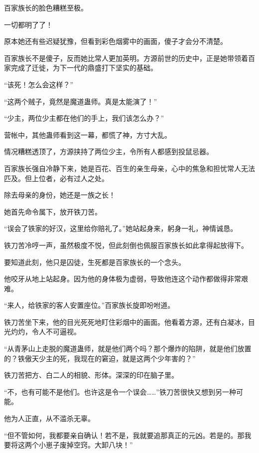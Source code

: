 
\begin{this_body}

百家族长的脸色糟糕至极。

一切都明了了！

原本她还有些迟疑犹豫，但看到彩色烟雾中的画面，傻子才会分不清楚。

百家族长不是傻子，反而她比常人更加英明。方源前世的历史中，正是她带领着百家完成了迁徙，为下一代的鼎盛打下坚实的基础。

“该死！怎么会这样？”

“这两个贼子，竟然是魔道蛊师。真是太能演了！”

“少主，两位少主都在他们的手上，我们该怎么办？”

营帐中，其他蛊师看到这一幕，都慌了神，方寸大乱。

情况糟糕透顶了，方源挟持了两位少主，令所有人都感到投鼠忌器。

百家族长强自冷静下来，她是百花、百生的亲生母亲，心中的焦急和担忧常人无法匹及。但上位者，必有过人之处。

除去母亲的身份，她还是一族之长！

她首先命令属下，放开铁刀苦。

“误会了铁家的好汉，这里给你赔礼了。”她站起身来，躬身一礼，神情诚恳。

铁刀苦冷哼一声，虽然极度不悦，但此刻倒也佩服百家族长如此拿得起放得下。

要知道此刻，他只是囚徒，生死都是百家族长的一个念头。

他咬牙从地上站起身。因为他的身体极为虚弱，导致他连这个动作都做得非常艰难。

“来人，给铁家的客人安置座位。”百家族长旋即吩咐道。

铁刀苦坐下来，他的目光死死地盯住彩烟中的画面。他看着方源，还有白凝冰，目光灼灼，令人不可逼视。

“从青茅山上走脱的魔道蛊师，就是他们两个吗？那个爆炸的陷阱，就是他们放置的？铁傲天少主的死，我现在的窘迫，就是这两个少年害的？”

铁刀苦把方、白二人的相貌、形体。深深的印在脑子里。

“不，也有可能不是他们。也许这是令一个误会……”铁刀苦很快又想到另一种可能。

他为人正直，从不滥杀无辜。

“但不管如何，我都要亲自确认！若不是，我就要追那真正的元凶。若是的。那我要将这两个小崽子废掉空窍。大卸八块！”


\end{this_body}
